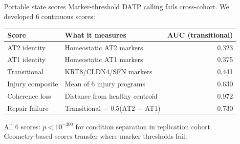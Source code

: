 \documentclass[aspectratio=169]{beamer}
\begin{document}
\begin{frame}{Portable state scores}
\small
Marker-threshold DATP calling \alert{fails cross-cohort}. We developed 6 continuous scores:
\vspace{0.3em}
\begin{tabular}{llr}
\toprule
Score & What it measures & AUC (transitional) \\
\midrule
AT2 identity & Homeostatic AT2 markers & 0.323 \\
AT1 identity & Homeostatic AT1 markers & 0.375 \\
Transitional & KRT8/CLDN4/SFN markers & 0.441 \\
Injury composite & Mean of 6 injury programs & 0.630 \\
\alert{Coherence loss} & Distance from healthy centroid & \alert{0.972} \\
Repair failure & Transitional $-$ 0.5(AT2 + AT1) & 0.730 \\
\bottomrule
\end{tabular}
\normalsize
\vspace{0.5em}

All 6 scores: $p < 10^{-300}$ for condition separation in replication cohort.\\
\alert{Geometry-based scores transfer where marker thresholds fail.}
\end{frame}
\end{document}
